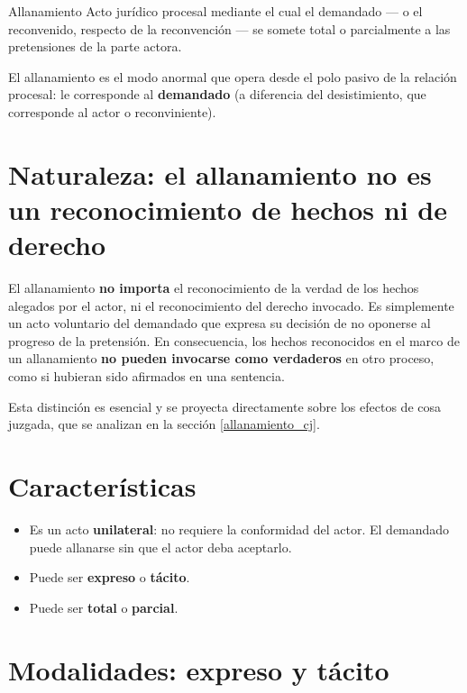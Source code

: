 \documentclass[12pt,oneside]{book}
\begin{document}
\begin{definition}{Allanamiento}
Acto jurídico procesal mediante el cual el demandado --- o el reconvenido, respecto de la reconvención --- se somete total o parcialmente a las pretensiones de la parte actora.
\end{definition}

El allanamiento es el modo anormal que opera desde el polo pasivo de la relación procesal: le corresponde al \textbf{demandado} (a diferencia del desistimiento, que corresponde al actor o reconviniente).

\section{Naturaleza: el allanamiento no es un reconocimiento de hechos ni de derecho}

\begin{important}
El allanamiento \textbf{no importa} el reconocimiento de la verdad de los hechos alegados por el actor, ni el reconocimiento del derecho invocado. Es simplemente un acto voluntario del demandado que expresa su decisión de no oponerse al progreso de la pretensión. En consecuencia, los hechos reconocidos en el marco de un allanamiento \textbf{no pueden invocarse como verdaderos} en otro proceso, como si hubieran sido afirmados en una sentencia.
\end{important}

Esta distinción es esencial y se proyecta directamente sobre los efectos de cosa juzgada, que se analizan en la sección \ref{allanamiento_cj}.

\section{Características}

\begin{itemize}
    \item Es un acto \textbf{unilateral}: no requiere la conformidad del actor. El demandado puede allanarse sin que el actor deba aceptarlo.
    \item Puede ser \textbf{expreso} o \textbf{tácito}.
    \item Puede ser \textbf{total} o \textbf{parcial}.
\end{itemize}

\section{Modalidades: expreso y tácito}
\end{document}
